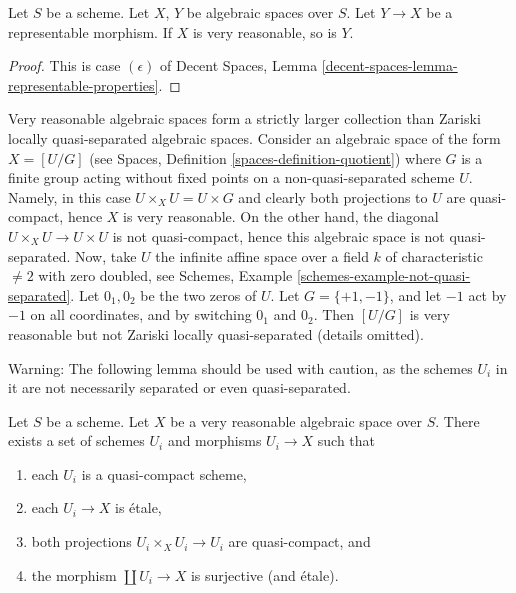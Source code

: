 \begin{lemma}
\label{lemma-representable-very-reasonable}
Let $S$ be a scheme.
Let $X$, $Y$ be algebraic spaces over $S$.
Let $Y \to X$ be a representable morphism.
If $X$ is very reasonable, so is $Y$.
\end{lemma}

\begin{proof}
This is case $(\epsilon)$ of
Decent Spaces, Lemma \ref{decent-spaces-lemma-representable-properties}.
\end{proof}

\begin{remark}
\label{remark-very-reasonable-Zariski-locally-quasi-separated}
Very reasonable algebraic spaces form a strictly larger collection than
Zariski locally quasi-separated algebraic spaces. Consider
an algebraic space of the form $X = [U/G]$ (see
Spaces, Definition \ref{spaces-definition-quotient})
where $G$ is a finite group acting without fixed points on a
non-quasi-separated scheme $U$. Namely, in this case
$U \times_X U = U \times G$ and clearly both projections to $U$ are
quasi-compact, hence $X$ is very reasonable. On the other hand, the diagonal
$U \times_X U \to U \times U$ is not quasi-compact, hence this
algebraic space is not quasi-separated. Now, take $U$ the infinite
affine space over a field $k$ of characteristic $\not = 2$ with
zero doubled, see
Schemes, Example \ref{schemes-example-not-quasi-separated}.
Let $0_1, 0_2$ be the two zeros of $U$. Let $G = \{+1, -1\}$, and
let $-1$ act by $-1$ on all coordinates, and by switching
$0_1$ and $0_2$. Then $[U/G]$ is very reasonable but not Zariski locally
quasi-separated (details omitted).
\end{remark}

\noindent
Warning: The following lemma should be used with caution, as the schemes
$U_i$ in it are not necessarily separated or even quasi-separated.

\begin{lemma}
\label{lemma-very-reasonable-quasi-compact-pieces}
Let $S$ be a scheme.
Let $X$ be a very reasonable algebraic space over $S$.
There exists a set of schemes
$U_i$ and morphisms $U_i \to X$ such that
\begin{enumerate}
\item each $U_i$ is a quasi-compact scheme,
\item each $U_i \to X$ is \'etale,
\item both projections $U_i \times_X U_i \to U_i$ are quasi-compact, and
\item the morphism $\coprod U_i \to X$ is surjective (and \'etale).
\end{enumerate}
\end{lemma}

